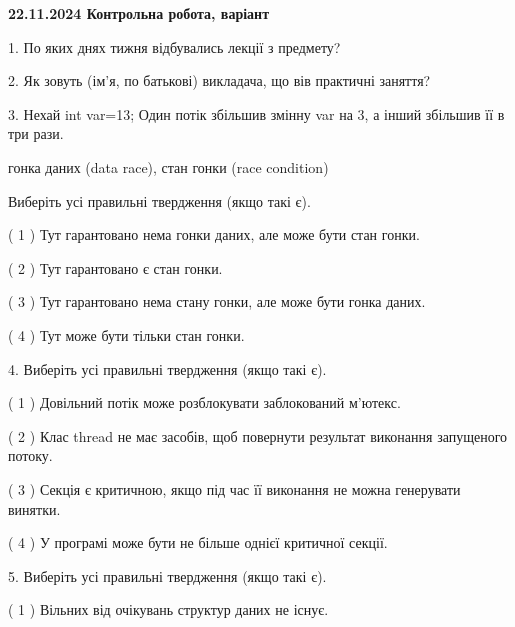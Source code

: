 \documentclass[12pt, ukrainian]{article}
\begin{document}
\vspace{4mm}
\newpage
\begin {large}

\textbf{22.11.2024 Контрольна робота, варіант  }\par


{
1. По яких днях тижня відбувались лекції з предмету?



\vspace{5mm}
2. Як зовуть (ім'я, по батькові) викладача, що вів практичні заняття?



\vspace{5mm}
3. Нехай int var=13; Один потік збільшив змінну var на 3, а інший збільшив її в три рази.

гонка даних (data race), стан гонки (race condition)

Виберіть усі правильні твердження (якщо такі є).\par
\vspace{2mm}
( 1 ) Тут гарантовано нема гонки даних, але може бути стан гонки.%

( 2 ) Тут гарантовано є стан гонки.%

( 3 ) Тут гарантовано нема стану гонки, але може бути гонка даних.%

( 4 ) Тут може бути тільки стан гонки.%


\vspace{5mm}
4. Виберіть усі правильні твердження (якщо такі є).\par
\vspace{2mm}

( 1 ) Довільний потік може розблокувати заблокований м’ютекс.%

( 2 ) Клас thread не має засобів, щоб повернути результат виконання запущеного потоку.%

( 3 ) Секція є критичною, якщо під час її виконання не можна генерувати винятки.%

( 4 ) У програмі може бути не більше однієї критичної секції.%


\vspace{5mm}
5. Виберіть усі правильні твердження (якщо такі є).\par
\vspace{2mm}

( 1 ) Вільних від очікувань структур даних не існує.%

}
\end{large}
\end{document}
